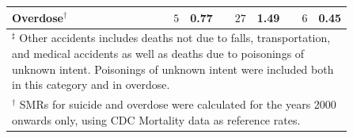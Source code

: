 \documentclass[]{article}
\begin{document}
\begin{table}[H]
\begin{tabular}{p{0.5\linewidth}rrcrrcrr}
  \hspace{10pt}Overdose$^\dagger$ & $5$ & 0.77 &  & $27$ & 1.49 &  & $6$ & 0.45 \\ 
   \hline 
 \multicolumn{9}{p{0.95\textwidth}}{\footnotesize$^\sharp$ Other accidents includes deaths not due to falls, transportation, and medical accidents as well as deaths due to poisonings of unknown intent. Poisonings of unknown intent were included both in this category and in overdose.}\\ 
\multicolumn{9}{p{0.95\textwidth}}{\footnotesize$^\dagger$ SMRs for suicide and overdose were calculated for the years 2000 onwards only, using CDC Mortality data as reference rates.}\\ \bottomrule
\end{tabular}
\end{table}
\end{document}
